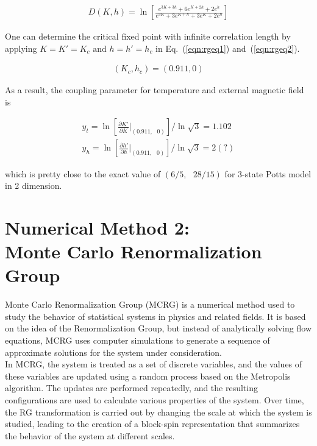 \documentclass[%
 reprint,
 amsmath,amssymb,
 aps,
]{revtex4-2}
\begin{document}

\begin{align}
D(K,h) = \ln\left[\frac{e^{3K+3h}+6e^{K+2h}+2e^{h}}{e^{3K}+3e^{K+h}+3e^{K}+2e^{h}}\right]
\end{align}

One can determine the critical fixed point with infinite correlation length by applying
$K=K'=K_c \text{ and }h=h'=h_c$ in Eq.~(\ref{eqn:rgeq1}) and~(\ref{eqn:rgeq2}).

\begin{eqnarray}
\left(K_c,h_c\right) = (0.911, 0) \label{eqn:cfp}
\end{eqnarray}

As a result, the coupling parameter for temperature and external magnetic field is

\begin{gather}
y_{t} = \ln\left[\frac{\partial K'}{\partial K} \bigg|_{(0.911,\text{ }0)}\right] / \ln\sqrt3 = 1.102 \\
y_{h} = \ln\left[\frac{\partial h'}{\partial h} \bigg|_{(0.911,\text{ }0)}\right] / \ln\sqrt3 = 2(?)
\end{gather}

which is pretty close to the exact value of $(6/5, \text{ } 28/15)$ for 3-state Potts model 
in 2 dimension.

\section{\label{sec:mcrg}Numerical Method 2: \\ Monte Carlo Renormalization Group}
Monte Carlo Renormalization Group (MCRG) is a numerical method used to study the 
behavior of statistical systems in physics and related fields. It is based on the 
idea of the Renormalization Group, but instead of analytically solving flow equations, 
MCRG uses computer simulations to generate a sequence of approximate solutions for 
the system under consideration. \\

In MCRG, the system is treated as a set of discrete variables, and the values of 
these variables are updated using a random process based on the Metropolis algorithm. 
The updates are performed repeatedly, and the resulting configurations are used to 
calculate various properties of the system. Over time, the RG transformation is carried 
out by changing the scale at which the system is studied, leading to the creation of a 
block-spin representation that summarizes the behavior of the system at different scales.\\
\end{document}
